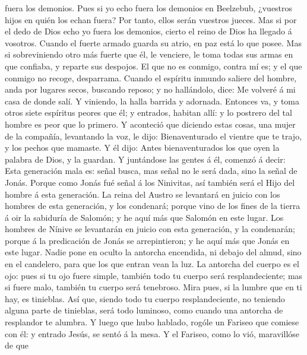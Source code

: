 fuera los demonios.  Pues si yo echo fuera los demonios
en Beelzebub, ¿vuestros hijos en quién los echan fuera? Por tanto, ellos
serán vuestros jueces.  Mas si por el dedo de Dios echo
yo fuera los demonios, cierto el reino de Dios ha llegado á vosotros.
 Cuando el fuerte armado guarda su atrio, en paz está lo
que posee.  Mas si sobreviniendo otro más fuerte que él,
le venciere, le toma todas sus armas en que confiaba, y reparte sus
despojos.  El que no es conmigo, contra mí es; y el que
conmigo no recoge, desparrama.  Cuando el espíritu
inmundo saliere del hombre, anda por lugares secos, buscando reposo; y
no hallándolo, dice: Me volveré á mi casa de donde salí. 
Y viniendo, la halla barrida y adornada.  Entonces va, y
toma otros siete espíritus peores que él; y entrados, habitan allí: y lo
postrero del tal hombre es peor que lo primero.  Y
aconteció que diciendo estas cosas, una mujer de la compañía, levantando
la voz, le dijo: Bienaventurado el vientre que te trajo, y los pechos
que mamaste.  Y él dijo: Antes bienaventurados los que
oyen la palabra de Dios, y la guardan.  Y juntándose las
gentes á él, comenzó á decir: Esta generación mala es: señal busca, mas
señal no le será dada, sino la señal de Jonás.  Porque
como Jonás fué señal á los Ninivitas, así también será el Hijo del
hombre á esta generación.  La reina del Austro se
levantará en juicio con los hombres de esta generación, y los condenará;
porque vino de los fines de la tierra á oir la sabiduría de Salomón; y
he aquí más que Salomón en este lugar.  Los hombres de
Nínive se levantarán en juicio con esta generación, y la condenarán;
porque á la predicación de Jonás se arrepintieron; y he aquí más que
Jonás en este lugar.  Nadie pone en oculto la antorcha
encendida, ni debajo del almud, sino en el candelero, para que los que
entran vean la luz.  La antorcha del cuerpo es el ojo:
pues si tu ojo fuere simple, también todo tu cuerpo será
resplandeciente; mas si fuere malo, también tu cuerpo será tenebroso.
 Mira pues, si la lumbre que en ti hay, es tinieblas.
 Así que, siendo todo tu cuerpo resplandeciente, no
teniendo alguna parte de tinieblas, será todo luminoso, como cuando una
antorcha de resplandor te alumbra.  Y luego que hubo
hablado, rogóle un Fariseo que comiese con él: y entrado Jesús, se sentó
á la mesa.  Y el Fariseo, como lo vió, maravillóse de que
